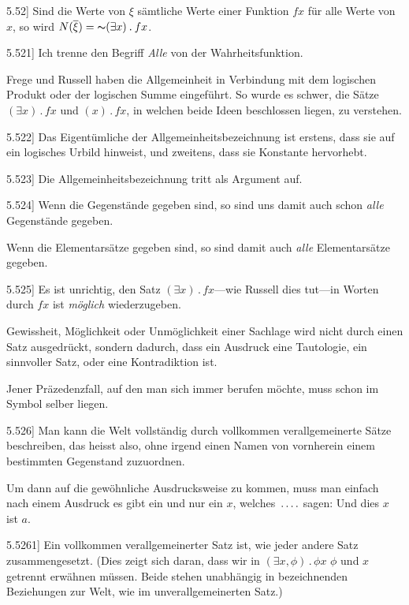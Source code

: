 \documentclass[12pt,oneside]{book}[2007/10/19]
\newcommand{\PropERef}[1]{\hyperref[PropE:#1]{#1}}
\newcommand{\PropositionG}[2]{%
  \item[\phantomsection\label{PropG:#1}\PropERef{#1}] #2%
}
\newcommand{\Not}[1]{\mathord{\thicksim} #1}
\newcommand{\DotOp}{\mathbin{.}}
\newcommand{\Emph}[1]{\emph{#1}}%
\newcommand{\fourdots}{\mathinner{\ldotp\ldotp\ldotp\ldotp}}
\begin{document}
\begin{propositions}
\PropositionG{5.52}
{Sind die Werte von $\xi$ sämtliche Werte einer
Funktion $fx$ für alle Werte von $x$, so wird
$N(\overline{\xi}) = \Not{(\exists x) \DotOp fx}$.}


\PropositionG{5.521}
{Ich trenne den Begriff \Emph{Alle} von der Wahrheitsfunktion.

Frege und Russell haben die Allgemeinheit in
Verbindung mit dem logischen Produkt oder der
logischen Summe eingeführt. So wurde es schwer,
die Sätze \glqq{}$(\exists x) \DotOp fx$\grqq{} und \glqq{}$(x) \DotOp fx$\grqq{}, in welchen beide
Ideen beschlossen liegen, zu verstehen.}


\PropositionG{5.522}
{Das Eigentümliche der Allgemeinheitsbezeichnung
ist erstens, dass sie auf ein logisches Urbild
hinweist, und zweitens, dass sie Konstante
hervorhebt.}


\PropositionG{5.523}
{Die Allgemeinheitsbezeichnung tritt als Argument
auf.}


\PropositionG{5.524}
{Wenn die Gegenstände gegeben sind, so sind
uns damit auch schon \Emph{alle} Gegenstände gegeben.

Wenn die Elementarsätze gegeben sind, so sind
damit auch \Emph{alle} Elementarsätze gegeben.}


\PropositionG{5.525}
{Es ist unrichtig, den Satz \glqq{}$(\exists x) \DotOp fx$\grqq{}---wie
Russell dies tut---in Worten durch \glqq{}$fx$ ist \Emph{möglich}\grqq{}
wiederzugeben.

Gewissheit, Möglichkeit oder Unmöglichkeit
einer Sachlage wird nicht durch einen Satz ausgedrückt,
sondern dadurch, dass ein Ausdruck eine
Tautologie, ein sinnvoller Satz, oder eine Kontradiktion
ist.

Jener Präzedenzfall, auf den man sich immer
berufen möchte, muss schon im Symbol selber
liegen.}


\PropositionG{5.526}
{Man kann die Welt vollständig durch vollkommen
verallgemeinerte Sätze beschreiben, das
heisst also, ohne irgend einen Namen von vornherein
einem bestimmten Gegenstand zuzuordnen.

Um dann auf die gewöhnliche Ausdrucksweise
zu kommen, muss man einfach nach einem Ausdruck
\glqq{}es gibt ein und nur ein $x$, welches~$\fourdots$\grqq{} sagen:
Und dies $x$ ist $a$.}


\PropositionG{5.5261}
{Ein vollkommen verallgemeinerter Satz ist, wie
jeder andere Satz zusammengesetzt. (Dies zeigt
sich daran, dass wir in \glqq{}$(\exists x, \phi) \DotOp \phi x$\grqq{} \glqq{}$\phi$\grqq{} und \glqq{}$x$\grqq{}
getrennt erwähnen müssen. Beide stehen unabhängig
in bezeichnenden Beziehungen zur Welt,
wie im unverallgemeinerten Satz.)

}
\end{propositions}
\end{document}
